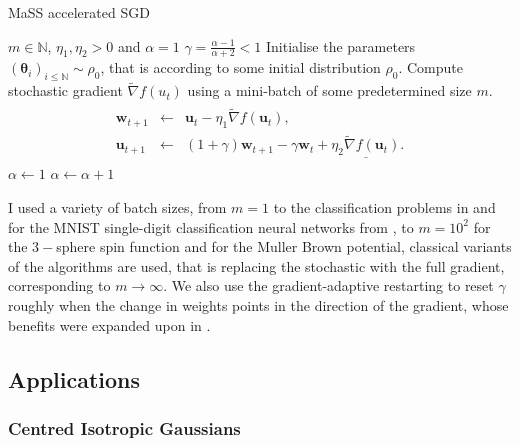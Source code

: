 \documentclass{article}
\theoremstyle{mystyle}
\newcommand{\N}{\ensuremath{\mathbb{N}}}
\begin{document}
\begin{examplesblock}{MaSS accelerated SGD}\label{alg: MaSS sgd}
\begin{algorithmic}
\Require $ m\in \N $, $ \eta_{1}, \eta_{2}>0$ and $ \alpha = 1$
\State $ \gamma = \frac{\alpha-1}{\alpha+2}<1$
\State Initialise the parameters $(\mathbf{\theta}_{i})_{i\leq \N} \sim \rho_{0}$, that is according to some initial distribution $ \rho_{0}$.
\State Compute stochastic gradient $\tilde{\nabla}f(u_{t}) $ using a mini-batch of some predetermined size $ m$.
\State  \begin{eqnarray}\left.\begin{array}{lll}
\mathbf{w}_{t+1} &\leftarrow& \mathbf{u}_t - \eta_1 \tilde{\nabla}f(\mathbf{u}_t), \\
\mathbf{u}_{t+1} &\leftarrow& (1+\gamma)\mathbf{w}_{t+1} - \gamma \mathbf{w}_{t} + \underline{ \eta_2 \tilde{\nabla}f(\mathbf{u}_t)}.\end{array}\right.
\end{eqnarray}
 
\State $ \alpha \leftarrow 1$
\EndIf 
\State $\alpha \leftarrow \alpha +1$
\EndWhile

\end{algorithmic}

\end{examplesblock}
  
I used a variety of batch sizes, from $m=1 $ to the classification problems in \cite{Mei_2018} and for the MNIST single-digit classification neural networks from \cite{sirignano2019meanfieldanalysislln}, to $ m=10^{2}$ for the $ 3-$sphere spin function and for the Muller Brown potential, classical variants of the algorithms are used, that is replacing the stochastic with the full gradient, corresponding to $ m \to \infty$. We also use the gradient-adaptive restarting to reset $ \gamma$ roughly when the change in weights points in the direction of the gradient, whose benefits were expanded upon in \cite{ odonoghue2012adaptiverestartacceleratedgradient}. 

\newpage
\subsection{Applications}

\subsubsection{Centred Isotropic Gaussians}
\end{document}
